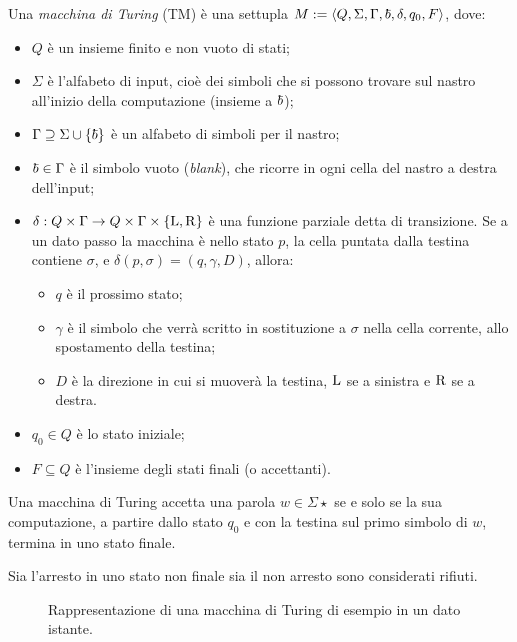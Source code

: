 \begin{defin}
	Una \emph{macchina di Turing} (TM) è una settupla $M:=\tuple{Q,\Sigma,\Gamma,\blank,\delta,q_0,F}$, dove:
	\begin{itemize}
		\item $Q$ è un insieme finito e non vuoto di stati;
		\item $\Sigma$ è l'alfabeto di input, cioè dei simboli che si possono trovare sul nastro all'inizio della computazione (insieme a $\blank$);
		\item $\Gamma\supseteq\Sigma\cup\set{\blank}$ è un alfabeto di simboli per il nastro;
		\item $\blank\in\Gamma$ è il simbolo vuoto (\emph{blank}), che ricorre in ogni cella del nastro a destra dell'input;
		\item $\delta:Q\times\Gamma\to Q\times\Gamma\times\left\{ \mathrm L,\mathrm R \right\}$ è una funzione parziale detta di transizione. Se a un dato passo la macchina è nello stato $p$, la cella puntata dalla testina contiene $\sigma$, e $\delta(p,\sigma)=(q,\gamma,D)$, allora:
		      \begin{itemize}
			      \item $q$ è il prossimo stato;
			      \item $\gamma$ è il simbolo che verrà scritto in sostituzione a $\sigma$ nella cella corrente, allo spostamento della testina;
			      \item $D$ è la direzione in cui si muoverà la testina, $\mathrm L$ se a sinistra e $\mathrm R$ se a destra.
		      \end{itemize}
		\item $q_0\in Q$ è lo stato iniziale;
		\item $F\subseteq Q$ è l'insieme degli stati finali (o accettanti).
	\end{itemize}
	Una macchina di Turing accetta una parola $w\in\Sigma\star$ se e solo se la sua computazione, a partire dallo stato $q_0$ e con la testina sul primo simbolo di $w$, termina in uno stato finale.
\end{defin}
\noindent Sia l'arresto in uno stato non finale sia il non arresto sono considerati rifiuti.

\begin{figure}
	\centering
	
	\caption{Rappresentazione di una macchina di Turing di esempio in un dato istante.}
\end{figure}

